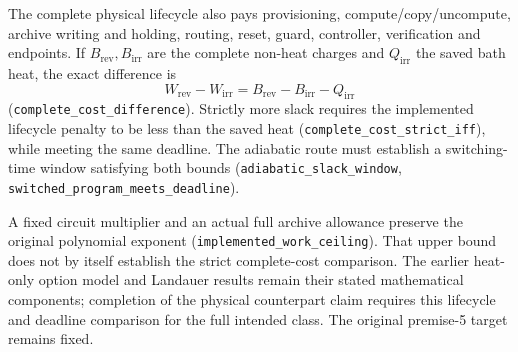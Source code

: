 \documentclass[
]{article}
\begin{document}
The complete physical lifecycle also pays provisioning,
c\allowbreak{}o\allowbreak{}m\allowbreak{}p\allowbreak{}u\allowbreak{}t\allowbreak{}e\allowbreak{}/\allowbreak{}c\allowbreak{}o\allowbreak{}p\allowbreak{}y\allowbreak{}/\allowbreak{}u\allowbreak{}n\allowbreak{}c\allowbreak{}o\allowbreak{}m\allowbreak{}p\allowbreak{}u\allowbreak{}t\allowbreak{}e\allowbreak{},
archive writing and holding, routing, reset, guard, controller,
verification and endpoints. If \(B_{\mathrm{rev}},B_{\mathrm{irr}}\) are
the complete non-heat charges and \(Q_{\mathrm{irr}}\) the saved bath
heat, the exact difference is \[
W_{\mathrm{rev}}-W_{\mathrm{irr}}=B_{\mathrm{rev}}-B_{\mathrm{irr}}-Q_{\mathrm{irr}}
\]
(\texttt{c\allowbreak{}o\allowbreak{}m\allowbreak{}p\allowbreak{}l\allowbreak{}e\allowbreak{}t\allowbreak{}e\allowbreak{}\_\allowbreak{}c\allowbreak{}o\allowbreak{}s\allowbreak{}t\allowbreak{}\_\allowbreak{}d\allowbreak{}i\allowbreak{}f\allowbreak{}f\allowbreak{}e\allowbreak{}r\allowbreak{}e\allowbreak{}n\allowbreak{}c\allowbreak{}e}).
Strictly more slack requires the implemented lifecycle penalty to be
less than the saved heat
(\texttt{c\allowbreak{}o\allowbreak{}m\allowbreak{}p\allowbreak{}l\allowbreak{}e\allowbreak{}t\allowbreak{}e\allowbreak{}\_\allowbreak{}c\allowbreak{}o\allowbreak{}s\allowbreak{}t\allowbreak{}\_\allowbreak{}s\allowbreak{}t\allowbreak{}r\allowbreak{}i\allowbreak{}c\allowbreak{}t\allowbreak{}\_\allowbreak{}i\allowbreak{}f\allowbreak{}f}),
while meeting the same deadline. The adiabatic route must establish a
switching-time window satisfying both bounds
(\texttt{a\allowbreak{}d\allowbreak{}i\allowbreak{}a\allowbreak{}b\allowbreak{}a\allowbreak{}t\allowbreak{}i\allowbreak{}c\allowbreak{}\_\allowbreak{}s\allowbreak{}l\allowbreak{}a\allowbreak{}c\allowbreak{}k\allowbreak{}\_\allowbreak{}w\allowbreak{}i\allowbreak{}n\allowbreak{}d\allowbreak{}o\allowbreak{}w},
\texttt{s\allowbreak{}w\allowbreak{}i\allowbreak{}t\allowbreak{}c\allowbreak{}h\allowbreak{}e\allowbreak{}d\allowbreak{}\_\allowbreak{}p\allowbreak{}r\allowbreak{}o\allowbreak{}g\allowbreak{}r\allowbreak{}a\allowbreak{}m\allowbreak{}\_\allowbreak{}m\allowbreak{}e\allowbreak{}e\allowbreak{}t\allowbreak{}s\allowbreak{}\_\allowbreak{}d\allowbreak{}e\allowbreak{}a\allowbreak{}d\allowbreak{}l\allowbreak{}i\allowbreak{}n\allowbreak{}e}).

A fixed circuit multiplier and an actual full archive allowance preserve
the original polynomial exponent
(\texttt{i\allowbreak{}m\allowbreak{}p\allowbreak{}l\allowbreak{}e\allowbreak{}m\allowbreak{}e\allowbreak{}n\allowbreak{}t\allowbreak{}e\allowbreak{}d\allowbreak{}\_\allowbreak{}w\allowbreak{}o\allowbreak{}r\allowbreak{}k\allowbreak{}\_\allowbreak{}c\allowbreak{}e\allowbreak{}i\allowbreak{}l\allowbreak{}i\allowbreak{}n\allowbreak{}g}).
That upper bound does not by itself establish the strict complete-cost
comparison. The earlier heat-only option model and Landauer results
remain their stated mathematical components; completion of the physical
counterpart claim requires this lifecycle and deadline comparison for
the full intended class. The original premise-5 target remains fixed.
\end{document}

